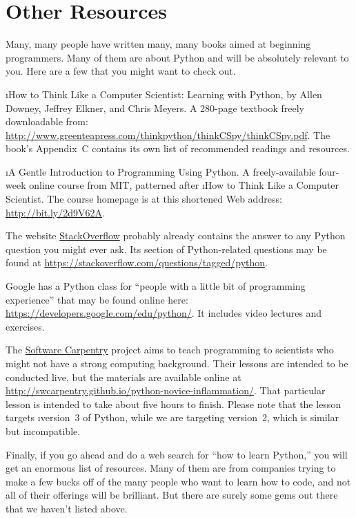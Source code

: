 \documentclass[letterpaper, 12pt, titlepage, twoside]{article}
\begin{document}
\newpage
\section*{Other Resources}

Many, many people have written many, many books aimed at beginning
programmers. Many of them are about Python and will be absolutely relevant to
you. Here are a few that you might want to check out.

\i{How to Think Like a Computer Scientist: Learning with Python}, by Allen
Downey, Jeffrey Elkner, and Chris Meyers. A 280-page textbook freely
downloadable from:
\url{http://www.greenteapress.com/thinkpython/thinkCSpy/thinkCSpy.pdf}. The
book's Appendix~C contains its own list of recommended readings and resources.

\i{A Gentle Introduction to Programming Using Python}. A freely-available
four-week online course from MIT, patterned after \i{How to Think Like a
  Computer Scientist}. The course homepage is at this shortened Web address:
\url{http://bit.ly/2d9V62A}.

The website \href{https://stackoverflow.com/}{StackOverflow} probably already
contains the answer to any Python question you might ever ask. Its section of
Python-related questions may be found at
\url{https://stackoverflow.com/questions/tagged/python}.

Google has a Python class for ``people with a little bit of programming
experience'' that may be found online here:
\url{https://developers.google.com/edu/python/}. It includes video lectures
and exercises.

The \href{https://software-carpentry.org/}{Software Carpentry} project aims to
teach programming to scientists who might not have a strong computing
background. Their lessons are intended to be conducted live, but the materials
are available online at
\url{http://swcarpentry.github.io/python-novice-inflammation/}. That
particular lesson is intended to take about five hours to finish. Please note
that the lesson targets \i{version~3} of Python, while we are targeting
version~2, which is similar but incompatible.

Finally, if you go ahead and do a web search for ``how to learn Python,'' you
will get an enormous list of resources. Many of them are from companies trying
to make a few bucks off of the many people who want to learn how to code, and
not all of their offerings will be brilliant. But there are surely some gems
out there that we haven't listed above.
\end{document}
